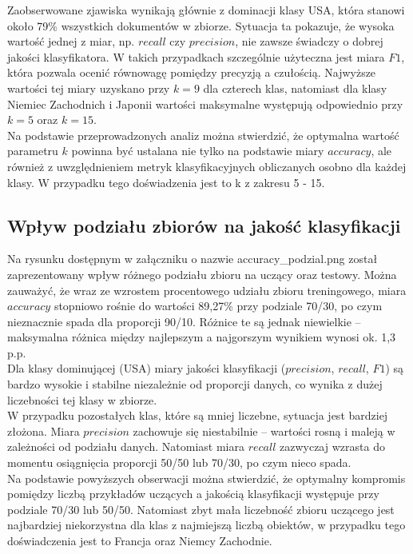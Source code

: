 \documentclass{article}
\begin{document}
Zaobserwowane zjawiska wynikają głównie z dominacji klasy USA, która stanowi około 79\% wszystkich dokumentów w zbiorze. Sytuacja ta pokazuje, że wysoka wartość jednej z miar, np. \(recall\) czy \(precision\), nie zawsze świadczy o dobrej jakości klasyfikatora. W takich przypadkach szczególnie użyteczna jest miara \(F1\), która pozwala ocenić równowagę pomiędzy precyzją a czułością. Najwyższe wartości tej miary uzyskano przy \(k = 9\) dla czterech klas, natomiast dla klasy Niemiec Zachodnich i Japonii wartości maksymalne występują odpowiednio przy \(k = 5\) oraz \(k = 15\). \\
Na podstawie przeprowadzonych analiz można stwierdzić, że optymalna wartość parametru \(k\) powinna być ustalana nie tylko na podstawie miary \(accuracy\), ale również z uwzględnieniem metryk klasyfikacyjnych obliczanych osobno dla każdej klasy. W przypadku tego doświadzenia jest to k z zakresu 5 - 15.

\subsection{Wpływ podziału zbiorów na jakość klasyfikacji}
Na rysunku dostępnym w załączniku o nazwie accuracy\_podzial.png został zaprezentowany wpływ różnego podziału zbioru na uczący oraz testowy. Można zauważyć, że wraz ze wzrostem procentowego udziału zbioru treningowego, miara \(accuracy\) stopniowo rośnie do wartości 89{,}27\% przy podziale 70/30, po czym nieznacznie spada dla proporcji 90/10. Różnice te są jednak niewielkie – maksymalna różnica między najlepszym a najgorszym wynikiem wynosi ok. 1,3 p.p. \\
Dla klasy dominującej (USA) miary jakości klasyfikacji (\(precision\), \(recall\), \(F1\)) są bardzo wysokie i stabilne niezależnie od proporcji danych, co wynika z dużej liczebności tej klasy w zbiorze. \\
W przypadku pozostałych klas, które są mniej liczebne, sytuacja jest bardziej złożona. Miara \(precision\) zachowuje się niestabilnie – wartości rosną i maleją w zależności od podziału danych. Natomiast miara \(recall\) zazwyczaj wzrasta do momentu osiągnięcia proporcji 50/50 lub 70/30, po czym nieco spada. \\
Na podstawie powyższych obserwacji można stwierdzić, że optymalny kompromis pomiędzy liczbą przykładów uczących a jakością klasyfikacji występuje przy podziale 70/30 lub 50/50. Natomiast zbyt mała liczebność zbioru uczącego jest najbardziej niekorzystna dla klas z najmiejszą liczbą obiektów, w przypadku tego doświadczenia jest to Francja oraz Niemcy Zachodnie.
\end{document}
